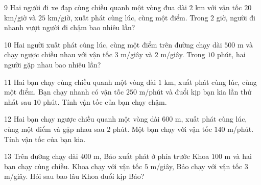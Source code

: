 \gap
\begin{probbox}{9}{\relax}
Hai người đi xe đạp cùng chiều quanh một vòng đua dài $2$ km với vận tốc $20$ km/giờ và $25$ km/giờ, xuất phát cùng lúc, cùng một điểm. Trong $2$ giờ, người đi nhanh vượt người đi chậm bao nhiêu lần?
\end{probbox}
\gap
\begin{probbox}{10}{\relax}
Hai người xuất phát cùng lúc, cùng một điểm trên đường chạy dài $500$ m và chạy ngược chiều nhau với vận tốc $3$ m/giây và $2$ m/giây. Trong $10$ phút, hai người gặp nhau bao nhiêu lần?
\end{probbox}
\gap
\begin{probbox}{11}{\relax}
Hai bạn chạy cùng chiều quanh một vòng dài $1$ km, xuất phát cùng lúc, cùng một điểm. Bạn chạy nhanh có vận tốc $250$ m/phút và đuổi kịp bạn kia lần thứ nhất sau $10$ phút. Tính vận tốc của bạn chạy chậm.
\end{probbox}
\gap
\begin{probbox}{12}{\relax}
Hai bạn chạy ngược chiều quanh một vòng dài $600$ m, xuất phát cùng lúc, cùng một điểm và gặp nhau sau $2$ phút. Một bạn chạy với vận tốc $140$ m/phút. Tính vận tốc của bạn kia.
\end{probbox}
\gap
\begin{probbox}{13}{\relax}
Trên đường chạy dài $400$ m, Bảo xuất phát ở phía trước Khoa $100$ m và hai bạn chạy cùng chiều. Khoa chạy với vận tốc $5$ m/giây, Bảo chạy với vận tốc $3$ m/giây. Hỏi sau bao lâu Khoa đuổi kịp Bảo?
\end{probbox}
